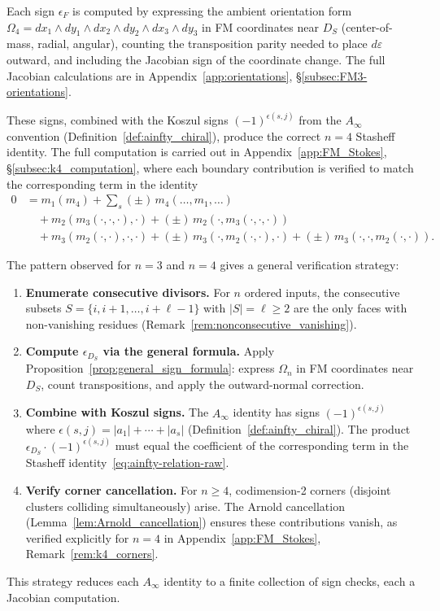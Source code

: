 \medskip\noindent
Each sign $\epsilon_F$ is computed by expressing the ambient orientation form $\Omega_4 = dx_1 \wedge dy_1 \wedge dx_2 \wedge dy_2 \wedge dx_3 \wedge dy_3$ in FM coordinates near $D_S$ (center-of-mass, radial, angular), counting the transposition parity needed to place $d\varepsilon$ outward, and including the Jacobian sign of the coordinate change. The full Jacobian calculations are in Appendix~\ref{app:orientations}, \S\ref{subsec:FM3-orientations}.

These signs, combined with the Koszul signs $(-1)^{\epsilon(s,j)}$ from the $A_\infty$ convention (Definition~\ref{def:ainfty_chiral}), produce the correct $n = 4$ Stasheff identity. The full computation is carried out in Appendix~\ref{app:FM_Stokes}, \S\ref{subsec:k4_computation}, where each boundary contribution is verified to match the corresponding term in the identity
\begin{align*}
0 &= m_1(m_4) + \sum_{s} (\pm)\, m_4(\ldots, m_1, \ldots) \\
&\quad + m_2(m_3(\cdot,\cdot,\cdot),\cdot) + (\pm)\, m_2(\cdot, m_3(\cdot,\cdot,\cdot)) \\
&\quad + m_3(m_2(\cdot,\cdot),\cdot,\cdot) + (\pm)\, m_3(\cdot, m_2(\cdot,\cdot),\cdot) + (\pm)\, m_3(\cdot,\cdot, m_2(\cdot,\cdot)).
\end{align*}

\begin{remark}
\label{rem:general_verification}
The pattern observed for $n = 3$ and $n = 4$ gives a general verification strategy:
\begin{enumerate}[label=(\arabic*)]
\item \textbf{Enumerate consecutive divisors.} For $n$ ordered inputs, the consecutive subsets $S = \{i, i+1, \ldots, i+\ell-1\}$ with $|S| = \ell \geq 2$ are the only faces with non-vanishing residues (Remark~\ref{rem:nonconsecutive_vanishing}).
\item \textbf{Compute $\epsilon_{D_S}$ via the general formula.} Apply Proposition~\ref{prop:general_sign_formula}: express $\Omega_n$ in FM coordinates near $D_S$, count transpositions, and apply the outward-normal correction.
\item \textbf{Combine with Koszul signs.} The $A_\infty$ identity has signs $(-1)^{\epsilon(s,j)}$ where $\epsilon(s,j) = |a_1| + \cdots + |a_s|$ (Definition~\ref{def:ainfty_chiral}). The product $\epsilon_{D_S} \cdot (-1)^{\epsilon(s,j)}$ must equal the coefficient of the corresponding term in the Stasheff identity~\eqref{eq:ainfty-relation-raw}.
\item \textbf{Verify corner cancellation.} For $n \geq 4$, codimension-2 corners (disjoint clusters colliding simultaneously) arise. The Arnold cancellation (Lemma~\ref{lem:Arnold_cancellation}) ensures these contributions vanish, as verified explicitly for $n = 4$ in Appendix~\ref{app:FM_Stokes}, Remark~\ref{rem:k4_corners}.
\end{enumerate}
This strategy reduces each $A_\infty$ identity to a finite collection of sign checks, each a Jacobian computation.
\end{remark}

